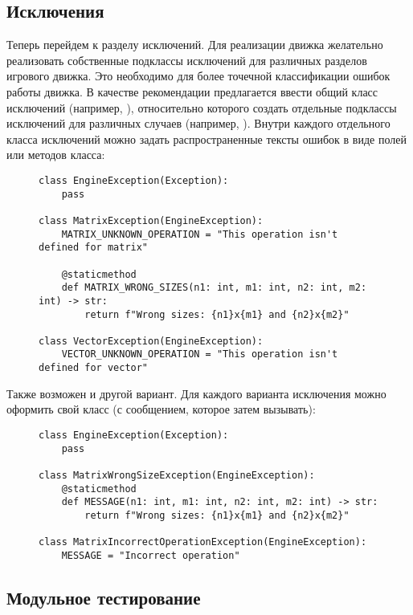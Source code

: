 \subsection{Исключения}

	Теперь перейдем к разделу исключений. Для реализации движка желательно реализовать собственные подклассы исключений для различных разделов игрового движка. Это необходимо для более точечной классификации ошибок работы движка. В качестве рекомендации предлагается ввести общий класс исключений (например, ), относительно которого создать отдельные подклассы исключений для различных случаев (например, ). Внутри каждого отдельного класса исключений можно задать распространенные тексты ошибок в виде полей или методов класса:

	\begin{figure}[H]
		\begin{lstlisting}[caption=<<Пример (Python)>>]
class EngineException(Exception):
	pass

class MatrixException(EngineException):
	MATRIX_UNKNOWN_OPERATION = "This operation isn't defined for matrix"

	@staticmethod
	def MATRIX_WRONG_SIZES(n1: int, m1: int, n2: int, m2: int) -> str:
		return f"Wrong sizes: {n1}x{m1} and {n2}x{m2}"

class VectorException(EngineException):
	VECTOR_UNKNOWN_OPERATION = "This operation isn't defined for vector"
		\end{lstlisting}
	\end{figure}

	Также возможен и другой вариант. Для каждого варианта исключения можно оформить свой класс (с сообщением, которое затем вызывать):
	\begin{figure}[H]
		\begin{lstlisting}[caption=<<Пример (Python)>>]
class EngineException(Exception):
	pass

class MatrixWrongSizeException(EngineException):
	@staticmethod
	def MESSAGE(n1: int, m1: int, n2: int, m2: int) -> str:
		return f"Wrong sizes: {n1}x{m1} and {n2}x{m2}"

class MatrixIncorrectOperationException(EngineException):
	MESSAGE = "Incorrect operation"
		\end{lstlisting}
	\end{figure}


\subsection{Модульное тестирование}

